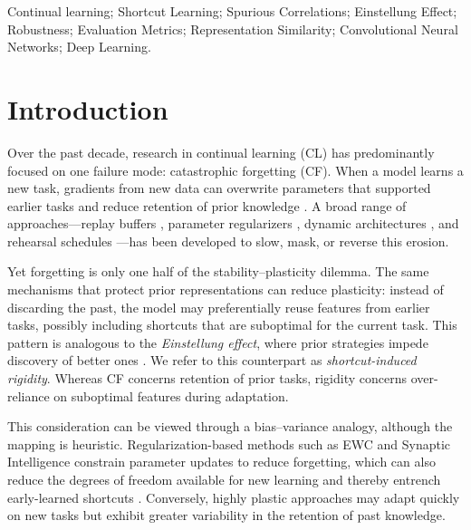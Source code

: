 \documentclass[conference]{IEEEtran}
\begin{document}
\begin{IEEEkeywords}
Continual learning; Shortcut Learning; Spurious Correlations; Einstellung Effect; Robustness; Evaluation Metrics; Representation Similarity; Convolutional Neural Networks; Deep Learning.
\end{IEEEkeywords}

\section{Introduction}

Over the past decade, research in continual learning (CL) has predominantly focused on one failure mode: catastrophic forgetting (CF). When a model learns a new task, gradients from new data can overwrite parameters that supported earlier tasks and reduce retention of prior knowledge \cite{doi:10.1073/pnas.1611835114,vandeven2024continuallearningcatastrophicforgetting}. A broad range of approaches—replay buffers \cite{NEURIPS2019_fa7cdfad,chaudhry2018efficient}, parameter regularizers \cite{doi:10.1073/pnas.1611835114,pmlr-v70-zenke17a}, dynamic architectures \cite{rusu2022progressiveneuralnetworks,yoon2018lifelonglearningdynamicallyexpandable}, and rehearsal schedules \cite{buzzega2020darkexperiencegeneralcontinual, Wang_2021_CVPR}—has been developed to slow, mask, or reverse this erosion.
 
Yet forgetting is only one half of the stability--plasticity dilemma. The same mechanisms that protect prior representations can reduce plasticity: instead of discarding the past, the model may preferentially reuse features from earlier tasks, possibly including shortcuts that are suboptimal for the current task. This pattern is analogous to the \emph{Einstellung effect}, where prior strategies impede discovery of better ones \cite{Binz2021ReconstructingTE}. We refer to this counterpart as \emph{shortcut-induced rigidity}. Whereas CF concerns retention of prior tasks, rigidity concerns over-reliance on suboptimal features during adaptation.
 
This consideration can be viewed through a bias--variance analogy, although the mapping is heuristic. Regularization-based methods such as EWC \cite{doi:10.1073/pnas.1611835114} and Synaptic Intelligence \cite{pmlr-v70-zenke17a} constrain parameter updates to reduce forgetting, which can also reduce the degrees of freedom available for new learning and thereby entrench early-learned shortcuts \cite{Kong2022BalancingSA}. Conversely, highly plastic approaches may adapt quickly on new tasks but exhibit greater variability in the retention of past knowledge.
 
\end{document}
